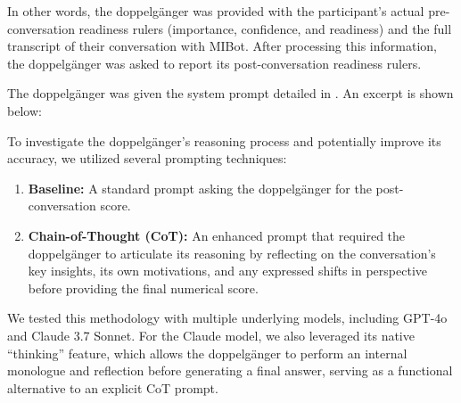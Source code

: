 In other words, the doppelgänger was provided with the participant's actual pre-conversation readiness rulers (importance, confidence, and readiness) and the full transcript of their conversation with MIBot. After processing this information, the doppelgänger was asked to report its post-conversation readiness rulers.

The doppelgänger was given the system prompt detailed in . An excerpt is shown below:


To investigate the doppelgänger's reasoning process and potentially improve its accuracy, we utilized several prompting techniques:

\begin{enumerate}
    \item \textbf{Baseline:} A standard prompt asking the doppelgänger for the post-conversation score.
    \item \textbf{Chain-of-Thought (CoT):} An enhanced prompt that required the doppelgänger to articulate its reasoning by reflecting on the conversation's key insights, its own motivations, and any expressed shifts in perspective before providing the final numerical score.
\end{enumerate}

We tested this methodology with multiple underlying models, including GPT-4o and Claude 3.7 Sonnet. For the Claude model, we also leveraged its native ``thinking'' feature, which allows the doppelgänger to perform an internal monologue and reflection before generating a final answer, serving as a functional alternative to an explicit CoT prompt.


